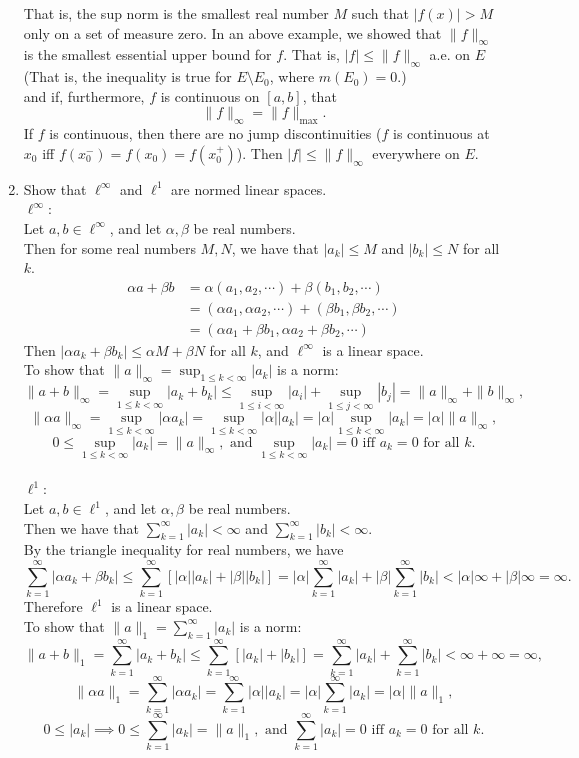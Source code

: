 \begin{enumerate}
	That is, the sup norm is the smallest real number $M$ such that $|f(x)|>M$ only on a set of measure zero.
	In an above example, we showed that $\|f\|_\infty$ is the smallest essential upper bound for $f$.
	That is, $|f|\le\|f\|_\infty$ a.e. on $E$ (That is, the inequality is true for $E\setminus E_0$, where $m(E_0)=0$.)
	\\
	and if, furthermore, $f$ is continuous on $[a,b]$, that
	\[
	\| f \|_{\infty} = \| f \|_{\max}.	
	\]
	If $f$ is continuous, then there are no jump discontinuities ($f$ is continuous at $x_0$ iff $f(x_0^-)=f(x_0)=f(x_0^+)$).
	Then $|f|\le\|f\|_\infty$ everywhere on $E$.
	\item Show that $\ell^\infty$ and $\ell^1$ are normed linear spaces.\\
	$\ell^\infty$:\\
	Let $a,b \in \ell^\infty$, and let $\alpha , \beta$ be real numbers.\\
	Then for some real numbers $M,N$, we have that $|a_k|\le M$ and $|b_k|\le N$ for all $k$.
	\begin{align*}
		\alpha a + \beta b &= \alpha (a_1,a_2,\cdots)+ \beta (b_1,b_2,\cdots)\\		
		&= (\alpha a_1,\alpha a_2,\cdots)+ (\beta b_1,\beta b_2,\cdots)\\
		&= (\alpha a_1+\beta b_1,\alpha a_2+\beta b_2,\cdots)
	\end{align*}
	Then $|\alpha a_k+\beta b_k|\le \alpha M + \beta N$ for all $k$, and $\ell^\infty$ is a linear space.\\
	To show that $\|a\|_\infty = \sup_{1\le k<\infty}|a_k|$ is a norm:
	\[
		\|a+b\|_\infty = \sup_{1\le k<\infty}|a_k+b_k|\le \sup_{1\le i<\infty}|a_i| + \sup_{1\le j<\infty}|b_j| = \|a\|_\infty + \|b\|_\infty,
	\]
	\[
		\|\alpha a\|_\infty = \sup_{1\le k<\infty}|\alpha a_k| = \sup_{1\le k<\infty}|\alpha|| a_k|= |\alpha|\sup_{1\le k<\infty}| a_k|=|\alpha|\|a\|_\infty, 
	\]
	\[
		0 \le \sup_{1\le k<\infty}| a_k| = \|a\|_\infty,\text{ and }\sup_{1\le k<\infty}| a_k|=0\text{ iff }a_k=0\text{ for all }k.	
	\]
	\\
	$\ell^1$:\\
	Let $a,b \in \ell^1$, and let $\alpha , \beta$ be real numbers.\\
	Then we have that $\sum_{k=1}^\infty|a_k|<\infty$ and $\sum_{k=1}^\infty|b_k|<\infty$.\\
	By the triangle inequality for real numbers, we have
	\[
		\sum_{k=1}^\infty |\alpha a_k + \beta b_k| \le\sum_{k=1}^\infty[ |\alpha|| a_k| + | \beta ||b_k|]= |\alpha|\sum_{k=1}^\infty | a_k| + |\beta |\sum_{k=1}^\infty |b_k| <|\alpha|\infty+|\beta|\infty = \infty.
	\]
	Therefore $\ell^1$ is a linear space.\\
	To show that $\|a\|_1 = \sum_{k=1}^\infty|a_k|$ is a norm:
	\[
		\|a+b\|_1 = \sum_{k=1}^\infty|a_k+b_k|\le\sum_{k=1}^\infty[|a_k|+|b_k|]=\sum_{k=1}^\infty|a_k|+\sum_{k=1}^\infty|b_k|<\infty +\infty = \infty,
	\]
	\[
		\|\alpha a\|_1 = \sum_{k=1}^\infty|\alpha a_k| = \sum_{k=1}^\infty|\alpha|| a_k|=|\alpha|\sum_{k=1}^\infty| a_k|=|\alpha|\|a\|_1, 
	\]
	\[
		0 \le | a_k| \implies 0 \le \sum_{k=1}^\infty |a_k| = \|a\|_1,\text{ and }\sum_{k=1}^\infty| a_k|=0\text{ iff }a_k=0\text{ for all }k.	
	\]
\end{enumerate}


